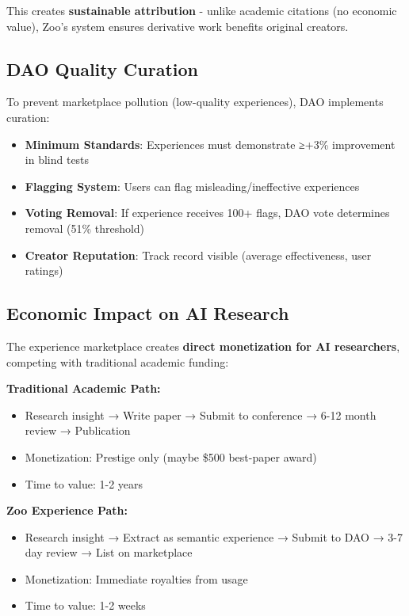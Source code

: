 This creates \textbf{sustainable attribution} - unlike academic citations (no economic value), Zoo's system ensures derivative work benefits original creators.

\subsection{DAO Quality Curation}

To prevent marketplace pollution (low-quality experiences), DAO implements curation:

\begin{itemize}
\item \textbf{Minimum Standards}: Experiences must demonstrate ≥+3\% improvement in blind tests
\item \textbf{Flagging System}: Users can flag misleading/ineffective experiences
\item \textbf{Voting Removal}: If experience receives 100+ flags, DAO vote determines removal (51\% threshold)
\item \textbf{Creator Reputation}: Track record visible (average effectiveness, user ratings)
\end{itemize}

\subsection{Economic Impact on AI Research}

The experience marketplace creates \textbf{direct monetization for AI researchers}, competing with traditional academic funding:

\textbf{Traditional Academic Path:}
\begin{itemize}
\item Research insight → Write paper → Submit to conference → 6-12 month review → Publication
\item Monetization: Prestige only (maybe \$500 best-paper award)
\item Time to value: 1-2 years
\end{itemize}

\textbf{Zoo Experience Path:}
\begin{itemize}
\item Research insight → Extract as semantic experience → Submit to DAO → 3-7 day review → List on marketplace
\item Monetization: Immediate royalties from usage
\item Time to value: 1-2 weeks
\end{itemize}

